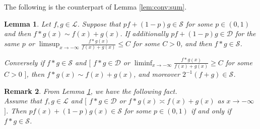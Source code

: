 \documentclass[12pt,leqno]{amsart}
\newtheorem{lemma}{Lemma}[section]
\newtheorem{remark}[lemma]{Remark}
\newcommand{\cals}{{\mathcal S}}
\newcommand{\call}{{\mathcal L}}
\newcommand{\cald}{{\mathcal D}}
\newcommand{\1}{{\mathbf 1}}
\begin{document}
The following is the counterpart of Lemma \ref{lem:conv:sum}. 
\begin{lemma}
\label{lem:conv:sum:R}
 Let $f,g\in \call$. Suppose that $pf+(1-p)g\in \cals$ for some $p\in(0,1)$ and then
 $f\ast g(x)\sim f(x)+g(x)$. If additionally $pf+(1-p)g\in \cald$ for the same $p$ or 
$\limsup_{x\to-\infty} \frac{f\ast g(x)}{f(x)+g(x)}\le C$ for some $C>0$, and then $f\ast g\in \cals$. 

Conversely if $f\ast g\in \cals$ and $[$ $f\ast g\in \cald$ or $\liminf_{x\to-\infty} \frac{f\ast g(x)}{f(x)+g(x)}\ge C $ for some $C>0$
$]$, then $f\ast g(x)\sim f(x)+g(x)$, and moreover $2^{-1}(f+g)\in \cals$. 
\end{lemma}
\begin{remark}
 From Lemma \ref{lem:conv:sum:R}, we have the following fact. \\
Assume that $f,g\in \call$ and $[$ $f\ast g\in \cald$ or $f\ast g(x) \asymp f(x)+g(x)$ as $x\to-\infty$ $]$. Then 
$pf(x)+(1-p)g(x)\in \cals$ for some $p\in (0,1)$ if and only if $f\ast g\in \cals$.  
\end{remark}
\end{document}
